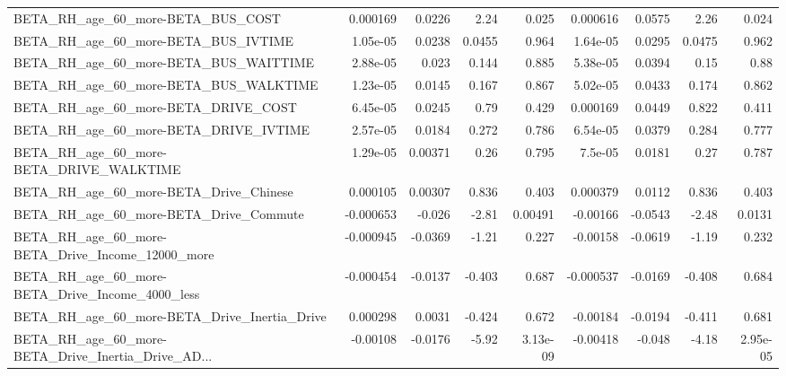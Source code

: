 \begin{tabular}{lrrrrrrrr}
BETA\_RH\_age\_60\_more-BETA\_BUS\_COST                  &    0.000169 &       0.0226 &     2.24 &    0.025 &   0.000616 &      0.0575 &         2.26 &         0.024 \\
BETA\_RH\_age\_60\_more-BETA\_BUS\_IVTIME                &    1.05e-05 &       0.0238 &   0.0455 &    0.964 &   1.64e-05 &      0.0295 &       0.0475 &         0.962 \\
BETA\_RH\_age\_60\_more-BETA\_BUS\_WAITTIME              &    2.88e-05 &        0.023 &    0.144 &    0.885 &   5.38e-05 &      0.0394 &         0.15 &          0.88 \\
BETA\_RH\_age\_60\_more-BETA\_BUS\_WALKTIME              &    1.23e-05 &       0.0145 &    0.167 &    0.867 &   5.02e-05 &      0.0433 &        0.174 &         0.862 \\
BETA\_RH\_age\_60\_more-BETA\_DRIVE\_COST                &    6.45e-05 &       0.0245 &     0.79 &    0.429 &   0.000169 &      0.0449 &        0.822 &         0.411 \\
BETA\_RH\_age\_60\_more-BETA\_DRIVE\_IVTIME              &    2.57e-05 &       0.0184 &    0.272 &    0.786 &   6.54e-05 &      0.0379 &        0.284 &         0.777 \\
BETA\_RH\_age\_60\_more-BETA\_DRIVE\_WALKTIME            &    1.29e-05 &      0.00371 &     0.26 &    0.795 &    7.5e-05 &      0.0181 &         0.27 &         0.787 \\
BETA\_RH\_age\_60\_more-BETA\_Drive\_Chinese             &    0.000105 &      0.00307 &    0.836 &    0.403 &   0.000379 &      0.0112 &        0.836 &         0.403 \\
BETA\_RH\_age\_60\_more-BETA\_Drive\_Commute             &   -0.000653 &       -0.026 &    -2.81 &  0.00491 &   -0.00166 &     -0.0543 &        -2.48 &        0.0131 \\
BETA\_RH\_age\_60\_more-BETA\_Drive\_Income\_12000\_more   &   -0.000945 &      -0.0369 &    -1.21 &    0.227 &   -0.00158 &     -0.0619 &        -1.19 &         0.232 \\
BETA\_RH\_age\_60\_more-BETA\_Drive\_Income\_4000\_less    &   -0.000454 &      -0.0137 &   -0.403 &    0.687 &  -0.000537 &     -0.0169 &       -0.408 &         0.684 \\
BETA\_RH\_age\_60\_more-BETA\_Drive\_Inertia\_Drive       &    0.000298 &       0.0031 &   -0.424 &    0.672 &   -0.00184 &     -0.0194 &       -0.411 &         0.681 \\
BETA\_RH\_age\_60\_more-BETA\_Drive\_Inertia\_Drive\_AD... &    -0.00108 &      -0.0176 &    -5.92 & 3.13e-09 &   -0.00418 &      -0.048 &        -4.18 &      2.95e-05 \\

\end{tabular}
